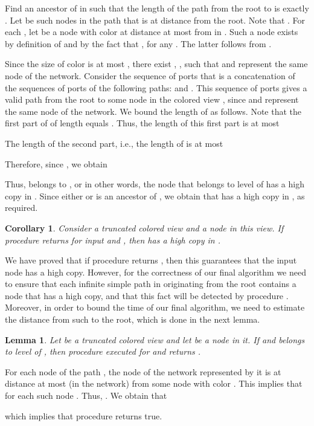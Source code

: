 \documentclass[a4paper,10pt]{article}
\newtheorem{lemma}{Lemma}[section]
\newtheorem{corollary}{Corollary}[section]
\newcommand{\qed}{\hfill  \smallbreak}
\newenvironment{proof}[1][Proof]
{\par\noindent{\bf #1:} }{\hspace*{\fill}\nolinebreak{}\bigskip\par}
\begin{document}
\begin{proof}
Find an ancestor  of  in  such that the length of the path from the root to  is exactly .
Let  be such nodes in the path  that  is at distance  from the root.
Note that .
For each , let  be a node with color  at distance at most  from  in .
Such a node  exists by definition of  and by the fact that , {for any} .
The latter follows from .

Since the size of color  is at most , there exist , , such that  and  represent the same node of the network.
Consider the sequence of ports that is a concatenation of the sequences of ports of the following paths:  and .
This sequence of ports gives a valid path from the root to some node  in the colored view , since  and  represent the same node of the network.
We bound the length  of  as follows.
Note that the first part of  of length  equals .
Thus, the length of this first part is at most

The length of the second part, i.e., the length of  is {at most}

Therefore, since , we obtain

Thus,  belongs to , or in other words, the node  that belongs to level  of  has a high copy in .
Since either  or  is an ancestor of , we obtain that  has a high copy in , as required.
\end{proof}

\begin{corollary} \label{cor:test:bound}
Consider a truncated colored view  and a node  in this view.
If procedure  returns  for input  and , then  has a high copy in .
\qed
\end{corollary}

We have proved that if procedure  returns , then this guarantees that the input node  has a high copy.
However, for the correctness of our final algorithm we need to ensure that each infinite simple path in  originating from the root contains a node  that has a high copy, and that this fact will be detected by procedure .
Moreover, in order to bound the time of our final algorithm, we need to estimate the distance from such  to the root, which is done in the next lemma.
\begin{lemma} \label{lem:test:finite}
Let  be a truncated colored view and let  be a node in it.
If  and  belongs to level  of , then procedure  executed for  and  returns .
\end{lemma}
\begin{proof}
For each node  of the path , the node of the network represented by it is at distance at most  (in the network) from some node with color .
This implies that  for each such node .
Thus, .
We obtain that

which implies that procedure  returns true.
\end{proof}
\end{document}
